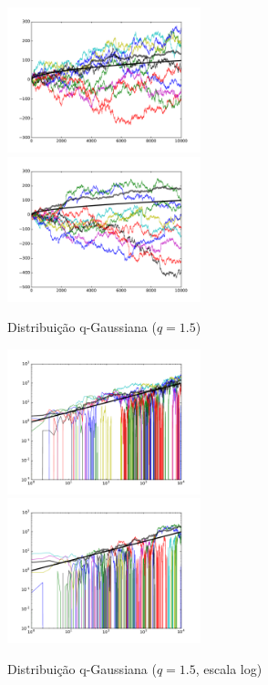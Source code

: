 \documentclass[12pt,a4paper,hidelinks]{article}
\begin{document}
  \pagebreak

  \begin{figure}[htb]
    \caption{Distribuição q-Gaussiana ($q = 1.5$)}
    \includegraphics[width=0.5\textwidth]{figures/1_5__0.pdf}
    \includegraphics[width=0.5\textwidth]{figures/1_5__1.pdf}
    \label{fig:randomwalk_q-gaussian_1.5}
  \end{figure}

  \begin{figure}[htb]
    \caption{Distribuição q-Gaussiana ($q = 1.5$, escala log)}
    \includegraphics[width=0.5\textwidth]{figures/1_5__0__log.pdf}
    \includegraphics[width=0.5\textwidth]{figures/1_5__1__log.pdf}
    \label{fig:randomwalk_q-gaussian_1.5_log}
  \end{figure}
\end{document}
